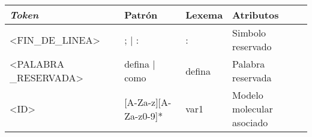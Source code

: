 \begin{landscape}
    \footnotesize
    \begin{longtable}{| p{0.2\textheight} | p{0.75\textheight} | p{0.2\textheight} | p{0.25\textheight} |}
        \hline
        \textit{Token}                 & Patrón                                                                                                                                                                                                                                                                                                                                                                                                                                                                                                                                                       & Lexema        & Atributos                                                              \\\hline
        <FIN\_DE\_LINEA>               & ; | :                                                                                                                                                                                                                                                                                                                                                                                                                                                                                                                                                        & :             & Simbolo reservado                                                      \\\hline
        <PALABRA \_RESERVADA>          & defina | como                                                                                                                                                                                                                                                                                                                                                                                                                                                                                                                                                & defina        & Palabra reservada                                                      \\\hline
        <ID>                           & [A-Za-z][A-Za-z0-9]*                                                                                                                                                                                                                                                                                                                                                                                                                                                                                                                                         & var1          & Modelo molecular asociado                                              \\\hline

\end{longtable}
\end{landscape}
